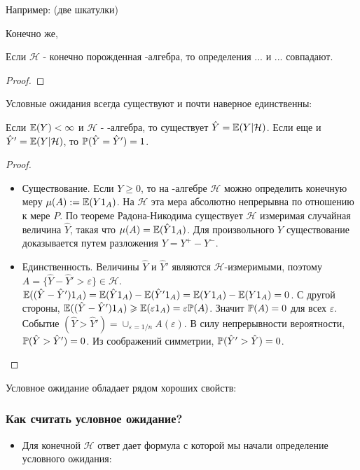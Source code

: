 {Например: (две шкатулки)

Конечно же,
\begin{myth}
Если $\mathcal{H}$ - конечно порожденная \s-алгебра, то определения ... и ... совпадают.
\end{myth}
\begin{proof}

\end{proof}

Условные ожидания всегда существуют и почти наверное единственны:
\begin{myth}
Если $\E(Y)<\infty$ и $\mathcal{H}$ - \s-алгебра, то существует $\hat{Y}=\E(Y|\mathcal{H})$. Если еще и $\hat{Y}'=\E(Y|\mathcal{H})$, то $\P(\hat{Y}=\hat{Y}')=1$.
\end{myth}
\begin{proof}
\begin{itemize}
\item Существование. Если $Y\geq 0$, то на \s-алгебре $\mathcal{H}$ можно определить конечную меру $\mu(A):=\E(Y1_{A})$. На $\mathcal{H}$ эта мера абсолютно непрерывна по отношению к мере $P$. По теореме Радона-Никодима существует $\mathcal{H}$ измеримая случайная величина $\hat{Y}$, такая что $\mu(A)=\E(\hat{Y}1_{A})$. Для произвольного $Y$ существование доказывается путем разложения $Y=Y^{+}-Y^{-}$.
\item Единственность. Величины $\hat{Y}$ и $\hat{Y}'$ являются $\mathcal{H}$-измеримыми, поэтому $A=\{\hat{Y}-\hat{Y}'>\varepsilon\}\in\mathcal{H}$. $\E((\hat{Y}-\hat{Y}')1_{A})=\E(\hat{Y}1_{A})-\E(\hat{Y}'1_{A})=\E(Y1_{A})-\E(Y1_{A})=0$. С другой стороны, $\E((\hat{Y}-\hat{Y}')1_{A})\geq \E(\varepsilon 1_{A})=\varepsilon \P(A)$. Значит $\P(A)=0$ для всех $\varepsilon$. Событие $(\hat{Y}>\hat{Y}')=\cup_{\varepsilon=1/n}A(\varepsilon)$. В силу непрерывности вероятности, $\P(\hat{Y}>\hat{Y}')=0$. Из соображений симметрии, $\P(\hat{Y}'>\hat{Y})=0$.
\end{itemize}
\end{proof}

Условное ожидание обладает рядом хороших свойств:


\subsubsection*{Как считать условное ожидание?}

\begin{itemize}
\item Для конечной $\mathcal{H}$ ответ дает формула с которой мы начали определение условного ожидания:



\end{itemize}}
